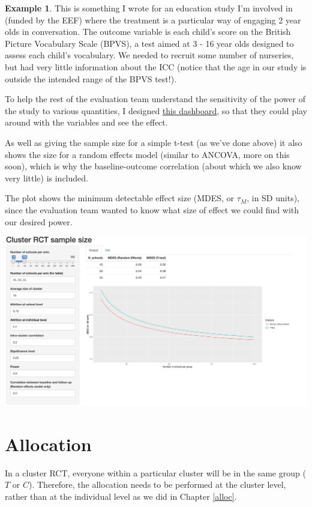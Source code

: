 \documentclass[
  openany]{book}
\theoremstyle{definition}
\theoremstyle{definition}
\newtheorem{example}{Example}[chapter]
\theoremstyle{definition}
\theoremstyle{definition}
\theoremstyle{remark}
\begin{document}
\begin{example}
This is something I wrote for an education study I'm involved in (funded by the EEF) where the treatment is a particular way of engaging 2 year olds in conversation. The outcome variable is each child's score on the British Picture Vocabulary Scale (BPVS), a test aimed at 3 - 16 year olds designed to assess each child's vocabulary. We needed to recruit some number of nurseries, but had very little information about the ICC (notice that the age in our study is outside the intended range of the BPVS test!).

To help the rest of the evaluation team understand the sensitivity of the power of the study to various quantities, I designed \href{https://racheloughton.shinyapps.io/sample_size/}{this dashboard}, so that they could play around with the variables and see the effect.

As well as giving the sample size for a simple t-test (as we've done above) it also shows the size for a random effects model (similar to ANCOVA, more on this soon), which is why the baseline-outcome correlation (about which we also know very little) is included.

The plot shows the minimum detectable effect size (MDES, or \(\tau_M\), in SD units), since the evaluation team wanted to know what size of effect we could find with our desired power.

\includegraphics[width=39.92in]{images/Screenshot_shiny}
\end{example}

\section{Allocation}\label{allocation}

In a cluster RCT, everyone within a particular cluster will be in the same group (\(T\) or \(C\)). Therefore, the allocation needs to be performed at the cluster level, rather than at the individual level as we did in Chapter \ref{alloc}.
\end{document}
